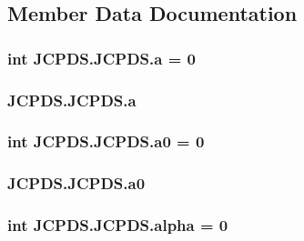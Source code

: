 \subsection{Member Data Documentation}
\hypertarget{class_j_c_p_d_s_1_1_j_c_p_d_s_a9418ae33987e25bb6cff0c2de64f8b60}{
\subsubsection[{a}]{\setlength{\rightskip}{0pt plus 5cm}int J\-C\-P\-D\-S.\-J\-C\-P\-D\-S.\-a = 0\hspace{0.3cm}{\ttfamily [static]}}}\label{class_j_c_p_d_s_1_1_j_c_p_d_s_a9418ae33987e25bb6cff0c2de64f8b60}
\hypertarget{class_j_c_p_d_s_1_1_j_c_p_d_s_a809397a9da7c35ae0a3ad9fca1cabc73}{
\subsubsection[{a}]{\setlength{\rightskip}{0pt plus 5cm}J\-C\-P\-D\-S.\-J\-C\-P\-D\-S.\-a}}\label{class_j_c_p_d_s_1_1_j_c_p_d_s_a809397a9da7c35ae0a3ad9fca1cabc73}
\hypertarget{class_j_c_p_d_s_1_1_j_c_p_d_s_aaa0b2a4a0b3ca6a97ea2fc55c905c29f}{
\subsubsection[{a0}]{\setlength{\rightskip}{0pt plus 5cm}int J\-C\-P\-D\-S.\-J\-C\-P\-D\-S.\-a0 = 0\hspace{0.3cm}{\ttfamily [static]}}}\label{class_j_c_p_d_s_1_1_j_c_p_d_s_aaa0b2a4a0b3ca6a97ea2fc55c905c29f}
\hypertarget{class_j_c_p_d_s_1_1_j_c_p_d_s_acfb0a8fef740164e10c7b87d92aa82d6}{
\subsubsection[{a0}]{\setlength{\rightskip}{0pt plus 5cm}J\-C\-P\-D\-S.\-J\-C\-P\-D\-S.\-a0}}\label{class_j_c_p_d_s_1_1_j_c_p_d_s_acfb0a8fef740164e10c7b87d92aa82d6}
\hypertarget{class_j_c_p_d_s_1_1_j_c_p_d_s_af4550ef102f3c38e2da9fe2e29b2c95b}{
\subsubsection[{alpha}]{\setlength{\rightskip}{0pt plus 5cm}int J\-C\-P\-D\-S.\-J\-C\-P\-D\-S.\-alpha = 0\hspace{0.3cm}{\ttfamily [static]}}}\label{class_j_c_p_d_s_1_1_j_c_p_d_s_af4550ef102f3c38e2da9fe2e29b2c95b}
